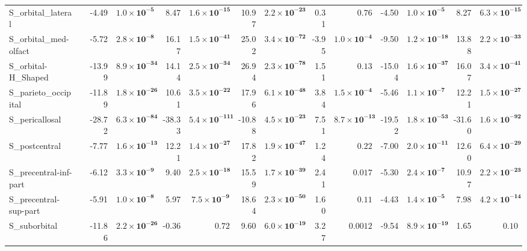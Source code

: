 {\begin{longtable}{llrrrrrrrrrrrr}
S\_orbital\_lateral &  & -4.49 & $\mathbf{1.0{\times}10^{-5}}$ & 8.47 & $\mathbf{1.6{\times}10^{-15}}$ & 10.97 & $\mathbf{2.2{\times}10^{-23}}$ & 0.31 & $0.76$ & -4.50 & $\mathbf{1.0{\times}10^{-5}}$ & 8.27 & $\mathbf{6.3{\times}10^{-15}}$ \\
S\_orbital\_med-olfact &  & -5.72 & $\mathbf{2.8{\times}10^{-8}}$ & 16.17 & $\mathbf{1.5{\times}10^{-41}}$ & 25.02 & $\mathbf{3.4{\times}10^{-72}}$ & -3.95 & $\mathbf{1.0{\times}10^{-4}}$ & -9.50 & $\mathbf{1.2{\times}10^{-18}}$ & 13.88 & $\mathbf{2.2{\times}10^{-33}}$ \\
S\_orbital-H\_Shaped &  & -13.99 & $\mathbf{8.9{\times}10^{-34}}$ & 14.14 & $\mathbf{2.5{\times}10^{-34}}$ & 26.94 & $\mathbf{2.3{\times}10^{-78}}$ & 1.51 & $0.13$ & -15.04 & $\mathbf{1.6{\times}10^{-37}}$ & 16.07 & $\mathbf{3.4{\times}10^{-41}}$ \\
S\_parieto\_occipital &  & -11.89 & $\mathbf{1.8{\times}10^{-26}}$ & 10.61 & $\mathbf{3.5{\times}10^{-22}}$ & 17.96 & $\mathbf{6.1{\times}10^{-48}}$ & 3.84 & $\mathbf{1.5{\times}10^{-4}}$ & -5.46 & $\mathbf{1.1{\times}10^{-7}}$ & 12.21 & $\mathbf{1.5{\times}10^{-27}}$ \\
S\_pericallosal &  & -28.72 & $\mathbf{6.3{\times}10^{-84}}$ & -38.33 & $\mathbf{5.4{\times}10^{-111}}$ & -10.88 & $\mathbf{4.5{\times}10^{-23}}$ & 7.51 & $\mathbf{8.7{\times}10^{-13}}$ & -19.52 & $\mathbf{1.8{\times}10^{-53}}$ & -31.60 & $\mathbf{1.6{\times}10^{-92}}$ \\
S\_postcentral &  & -7.77 & $\mathbf{1.6{\times}10^{-13}}$ & 12.21 & $\mathbf{1.4{\times}10^{-27}}$ & 17.82 & $\mathbf{1.9{\times}10^{-47}}$ & 1.24 & $0.22$ & -7.00 & $\mathbf{2.0{\times}10^{-11}}$ & 12.60 & $\mathbf{6.4{\times}10^{-29}}$ \\
S\_precentral-inf-part &  & -6.12 & $\mathbf{3.3{\times}10^{-9}}$ & 9.40 & $\mathbf{2.5{\times}10^{-18}}$ & 15.59 & $\mathbf{1.7{\times}10^{-39}}$ & 2.41 & $0.017$ & -5.30 & $\mathbf{2.4{\times}10^{-7}}$ & 10.97 & $\mathbf{2.2{\times}10^{-23}}$ \\
S\_precentral-sup-part &  & -5.91 & $\mathbf{1.0{\times}10^{-8}}$ & 5.97 & $\mathbf{7.5{\times}10^{-9}}$ & 18.64 & $\mathbf{2.3{\times}10^{-50}}$ & 1.60 & $0.11$ & -4.43 & $\mathbf{1.4{\times}10^{-5}}$ & 7.98 & $\mathbf{4.2{\times}10^{-14}}$ \\
S\_suborbital &  & -11.86 & $\mathbf{2.2{\times}10^{-26}}$ & -0.36 & $0.72$ & 9.60 & $\mathbf{6.0{\times}10^{-19}}$ & 3.27 & $0.0012$ & -9.54 & $\mathbf{8.9{\times}10^{-19}}$ & 1.65 & $0.10$ \\

\end{longtable}}
